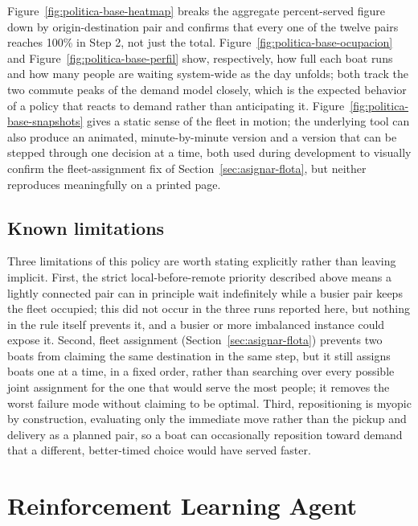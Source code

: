 \documentclass[11pt,a4paper]{article}
\begin{document}
Figure~\ref{fig:politica-base-heatmap} breaks the aggregate percent-served figure down by origin-destination pair and confirms that every one of the twelve pairs reaches 100\% in Step 2, not just the total. Figure~\ref{fig:politica-base-ocupacion} and Figure~\ref{fig:politica-base-perfil} show, respectively, how full each boat runs and how many people are waiting system-wide as the day unfolds; both track the two commute peaks of the demand model closely, which is the expected behavior of a policy that reacts to demand rather than anticipating it. Figure~\ref{fig:politica-base-snapshots} gives a static sense of the fleet in motion; the underlying tool can also produce an animated, minute-by-minute version and a version that can be stepped through one decision at a time, both used during development to visually confirm the fleet-assignment fix of Section~\ref{sec:asignar-flota}, but neither reproduces meaningfully on a printed page.

\subsection{Known limitations}
\label{sec:limitaciones-politica-base}

Three limitations of this policy are worth stating explicitly rather than leaving implicit. First, the strict local-before-remote priority described above means a lightly connected pair can in principle wait indefinitely while a busier pair keeps the fleet occupied; this did not occur in the three runs reported here, but nothing in the rule itself prevents it, and a busier or more imbalanced instance could expose it. Second, fleet assignment (Section~\ref{sec:asignar-flota}) prevents two boats from claiming the same destination in the same step, but it still assigns boats one at a time, in a fixed order, rather than searching over every possible joint assignment for the one that would serve the most people; it removes the worst failure mode without claiming to be optimal. Third, repositioning is myopic by construction, evaluating only the immediate move rather than the pickup and delivery as a planned pair, so a boat can occasionally reposition toward demand that a different, better-timed choice would have served faster.

\section{Reinforcement Learning Agent}
\label{sec:rl}
\end{document}
